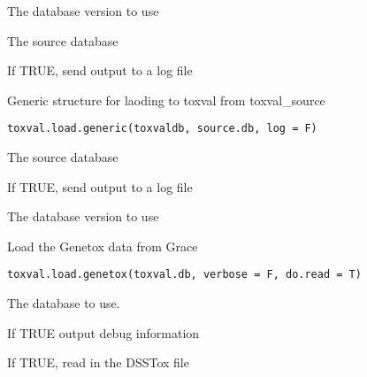 \documentclass[letterpaper]{book}
\begin{document}
%
\begin{Arguments}
\begin{ldescription}
\item[\code{toxval.db}] The database version to use

\item[\code{source.db}] The source database

\item[\code{log}] If TRUE, send output to a log file
\end{ldescription}
\end{Arguments}
%
\begin{Description}\relax
Generic structure for laoding to toxval from toxval\_source
\end{Description}
%
\begin{Usage}
\begin{verbatim}
toxval.load.generic(toxvaldb, source.db, log = F)
\end{verbatim}
\end{Usage}
%
\begin{Arguments}
\begin{ldescription}
\item[\code{source.db}] The source database

\item[\code{log}] If TRUE, send output to a log file

\item[\code{toxval.db}] The database version to use
\end{ldescription}
\end{Arguments}
%
\begin{Description}\relax
Load the Genetox data from Grace
\end{Description}
%
\begin{Usage}
\begin{verbatim}
toxval.load.genetox(toxval.db, verbose = F, do.read = T)
\end{verbatim}
\end{Usage}
%
\begin{Arguments}
\begin{ldescription}
\item[\code{toxval.db}] The database to use.

\item[\code{verbose}] If TRUE output debug information

\item[\code{do.read}] If TRUE, read in the DSSTox file
\end{ldescription}
\end{Arguments}
\end{document}
